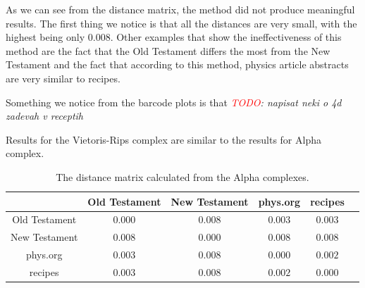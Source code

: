 \documentclass[12pt,a4paper]{amsart}
\begin{document}
As we can see from the distance matrix, the method did not produce meaningful
results. The first thing we notice is that all the distances are very small,
with the highest being only $0.008$. Other examples that show the ineffectiveness
of this method are the fact that the Old Testament differs the most from the New
Testament and the fact that according to this method, physics article abstracts
are very similar to recipes.

Something we notice from the barcode plots is that
\emph{\textcolor{red}{TODO}: napisat neki o 4d zadevah v receptih}

Results for the Vietoris-Rips complex are similar to the results for Alpha complex.

\begin{table}
  \centering
  \begin{tabular}{c|ccccc}
                  & Old Testament & New Testament & phys.org & recipes \\ \hline
    Old Testament & $0.000$ & $0.008$ & $0.003$ & $0.003$ \\
    New Testament & $0.008$ & $0.000$ & $0.008$ & $0.008$ \\
    phys.org      & $0.003$ & $0.008$ & $0.000$ & $0.002$ \\
    recipes       & $0.003$ & $0.008$ & $0.002$ & $0.000$ \\
  \end{tabular}

  \caption{The distance matrix calculated from the Alpha complexes.}
  \label{tab:alpha}
\end{table}
\end{document}
